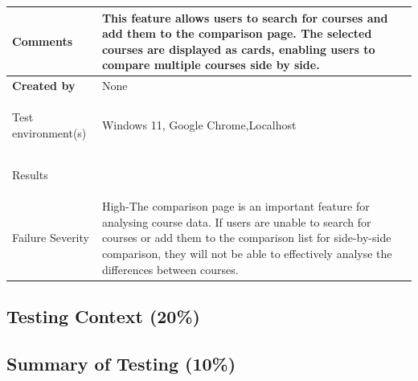 \begin{table}[h]
\begin{tabularx}{\linewidth}{>{\bfseries}l X}
\hline

Comments & This feature allows users to search for courses and add them to the comparison page.
The selected courses are displayed as cards, enabling users to compare multiple courses side by side. \\ \hline

Created by & None \\ \hline

Test environment(s) & Windows 11, Google Chrome,Localhost\\ \hline

Results &  \\ \hline

Failure Severity& High-The comparison page is an important feature for analysing course data. If users are unable to search for courses or add them to the comparison list for side-by-side comparison, they will not be able to effectively analyse the differences between courses.\\ \hline
\end{tabularx}
\end{table}




\subsection{Testing Context (20\%)}

\subsection{Summary of Testing (10\%)}
